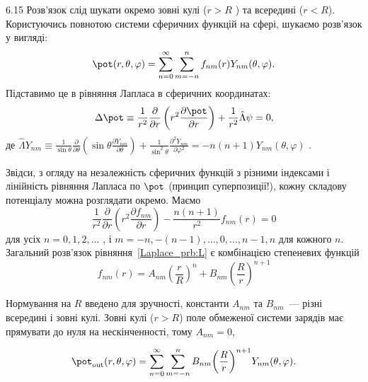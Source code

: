 \begin{Solution}{6.{15}}
	Розв'язок слід шукати окремо зовні кулі ($r >R$ ) та всередині ($r<R$). Користуючись повнотою системи сферичних функцій на сфері, шукаємо розв’язок у вигляді:
	\[
		\pot(r,\theta ,\varphi ) = \sum\limits_{n = 0}^\infty  {\sum\limits_{m =  - n}^n {{f_{nm}}(r){Y_{nm}}(\theta ,\varphi )} } .
	\]
	Підставимо це в рівняння Лапласа в сферичних координатах:
	\begin{equation}\label{Laplace_prb:L}
		\Delta \pot  \equiv \frac{1}{{{r^2}}}\frac{\partial }{{\partial r}}\left( {{r^2}\frac{{\partial \pot }}{{\partial r}}} \right) + \frac{1}{{{r^2}}}\hat \Lambda \psi  = 0,
	\end{equation}
	де \(\hat \Lambda {Y_{nm}} \equiv \frac{1}{{\sin \theta }}\frac{\partial }{{\partial \theta }}\left( {\sin \theta \frac{{\partial {Y_{nm}}}}{{\partial \theta }}} \right) + \frac{1}{{{{\sin }^2}\theta }}\frac{{{\partial ^2}{Y_{nm}}}}{{\partial {\varphi ^2}}} =  - n\left( {n + 1} \right){Y_{nm}}\left( {\theta ,\varphi } \right)\) .

	Звідси, з огляду на незалежність сферичних функцій з різними індексами і лінійність рівняння Лапласа по $\pot$  (принцип суперпозиції!), кожну складову потенціалу можна розглядати окремо. Маємо
	\[
		\frac{1}{{{r^2}}}\frac{\partial }{{\partial r}}\left( {{r^2}\frac{{\partial {f_{nm}}}}{{\partial r}}} \right) - \frac{{n\left( {n + 1} \right)}}{{{r^2}}}{f_{nm}}(r) = 0
	\]
	для усіх $n= 0,1,2,\ldots$ , і $m = -n, -(n-1), \ldots, 0, \ldots, n-1, n$  для кожного $n$.
	Загальний розв’язок рівняння~\eqref{Laplace_prb:L} є комбінацією степеневих функцій
	\begin{equation}\label{star_prb:L}
		f_{nm}(r) = A_{nm}{\left( {\frac{r}{R}} \right)^n} + {B_{nm}}{\left( {\frac{R}{r}} \right)^{n + 1}}
	\end{equation}

	Нормування на $R$ введено для зручності, константи $A_{nm}$ та $B_{nm}$~--- різні всередині і зовні кулі.
	Зовні кулі ($r >R$) поле обмеженої системи зарядів має прямувати до нуля на нескінченності, тому $A_{nm} = 0$,

	\begin{equation}\label{dstar_prb:L}
		\pot_\mathrm{out}(r,\theta ,\varphi ) = \sum\limits_{n = 0}^\infty  {\sum\limits_{m =  - n}^n {{B_{nm}}{{\left( {\frac{R}{r}} \right)}^{n + 1}}{Y_{nm}}(\theta ,\varphi )} }.
	\end{equation}


\end{Solution}
